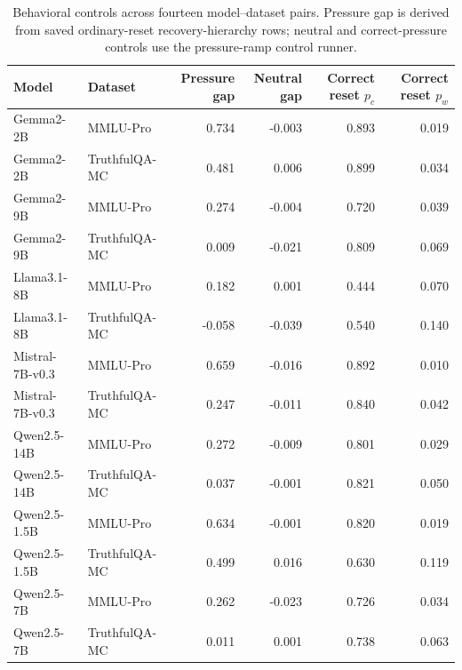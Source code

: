 \begin{table}[t]
\centering
\small
\begin{tabular}{llrrrr}
\hline
Model & Dataset & Pressure gap & Neutral gap & Correct reset $p_c$ & Correct reset $p_w$ \\
\hline
Gemma2-2B & MMLU-Pro & 0.734 & -0.003 & 0.893 & 0.019 \\
Gemma2-2B & TruthfulQA-MC & 0.481 & 0.006 & 0.899 & 0.034 \\
Gemma2-9B & MMLU-Pro & 0.274 & -0.004 & 0.720 & 0.039 \\
Gemma2-9B & TruthfulQA-MC & 0.009 & -0.021 & 0.809 & 0.069 \\
Llama3.1-8B & MMLU-Pro & 0.182 & 0.001 & 0.444 & 0.070 \\
Llama3.1-8B & TruthfulQA-MC & -0.058 & -0.039 & 0.540 & 0.140 \\
Mistral-7B-v0.3 & MMLU-Pro & 0.659 & -0.016 & 0.892 & 0.010 \\
Mistral-7B-v0.3 & TruthfulQA-MC & 0.247 & -0.011 & 0.840 & 0.042 \\
Qwen2.5-14B & MMLU-Pro & 0.272 & -0.009 & 0.801 & 0.029 \\
Qwen2.5-14B & TruthfulQA-MC & 0.037 & -0.001 & 0.821 & 0.050 \\
Qwen2.5-1.5B & MMLU-Pro & 0.634 & -0.001 & 0.820 & 0.019 \\
Qwen2.5-1.5B & TruthfulQA-MC & 0.499 & 0.016 & 0.630 & 0.119 \\
Qwen2.5-7B & MMLU-Pro & 0.262 & -0.023 & 0.726 & 0.034 \\
Qwen2.5-7B & TruthfulQA-MC & 0.011 & 0.001 & 0.738 & 0.063 \\
\hline
\end{tabular}
\caption{Behavioral controls across fourteen model--dataset pairs. Pressure gap is derived from saved ordinary-reset recovery-hierarchy rows; neutral and correct-pressure controls use the pressure-ramp control runner.}
\label{tab:behavioral-controls-full14}
\end{table}
